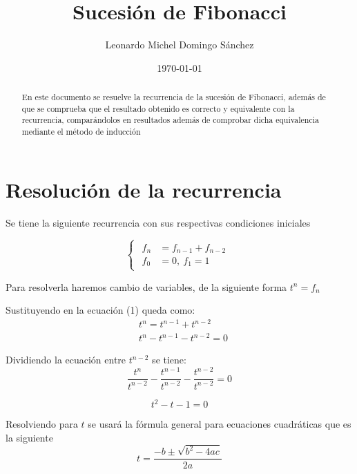 \documentclass[letterpaper,11pt, fleqn]{article}
\title{Sucesión de Fibonacci}
\author{Leonardo Michel Domingo Sánchez}
\date{\today}
\begin{document}
\maketitle
\tableofcontents

\begin{abstract}
	En este documento se resuelve la recurrencia de la sucesión de Fibonacci, además de que se comprueba que el resultado obtenido es correcto y equivalente con la recurrencia, comparándolos en resultados además de comprobar dicha equivalencia mediante el método de inducción
\end{abstract}

\section{Resolución de la recurrencia}
Se tiene la siguiente recurrencia con sus respectivas condiciones iniciales

\begin{equation}
\begin{cases}
\begin{aligned}
	f_{n} &= f_{n-1} + f_{n-2} \\
	f_{0} &= 0, \ f_{1} = 1
\end{aligned}
\end{cases}
\end{equation}

Para resolverla haremos cambio de variables, de la siguiente forma
$t^{n} = f_{n}$

Sustituyendo en la ecuación (1) queda como:
\begin{equation*}
	\begin{aligned}
		&t^{n} = t^{n-1} + t^{n-2} \\
		&t^{n} - t^{n-1} - t^{n-2} = 0
	\end{aligned}
\end{equation*}

Dividiendo la ecuación entre $t^{n-2}$ se tiene:
\begin{equation*}
	\frac{t^{n}}{t^{n-2}} - \frac{t^{n-1}}{t^{n-2}} - \frac{t^{n-2}}{t^{n-2}} = 0
\end{equation*}

\begin{equation}
	t^{2} - t - 1 = 0
\end{equation}

Resolviendo para $t$ se usará la fórmula general para ecuaciones cuadráticas que es la siguiente \[t = \frac{-b \pm \sqrt{b^2 - 4ac}}{2a}\] \newpage
\end{document}
